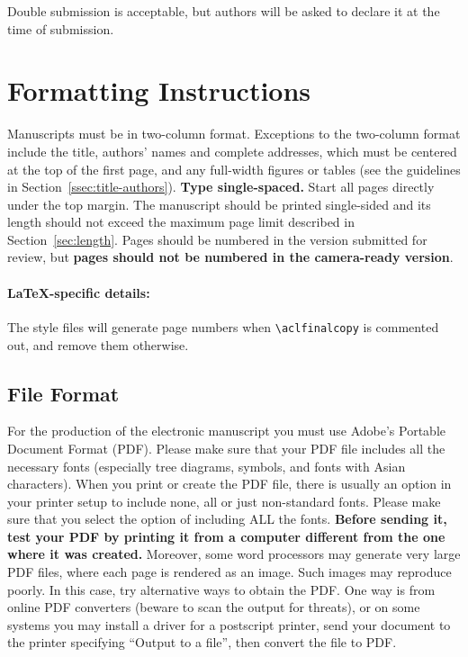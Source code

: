 \documentclass[11pt,a4paper]{article}
\begin{document}
Double submission is acceptable, but authors will be asked to declare it at the time of submission. 

\section{Formatting Instructions}

Manuscripts must be in two-column format.
Exceptions to the two-column format include the title, authors' names and complete addresses, which must be centered at the top of the first page, and any full-width figures or tables (see the guidelines in Section~\ref{ssec:title-authors}).
\textbf{Type single-spaced.}
Start all pages directly under the top margin.
The manuscript should be printed single-sided and its length should not exceed the maximum page limit described in Section~\ref{sec:length}.
Pages should be numbered in the version submitted for review, but \textbf{pages should not be numbered in the camera-ready version}.

\paragraph{\LaTeX-specific details:}
The style files will generate page numbers when {\small\verb|\aclfinalcopy|} is commented out, and remove them otherwise.


\subsection{File Format}
\label{sect:pdf}

For the production of the electronic manuscript you must use Adobe's Portable Document Format (PDF).
Please make sure that your PDF file includes all the necessary fonts (especially tree diagrams, symbols, and fonts with Asian characters).
When you print or create the PDF file, there is usually an option in your printer setup to include none, all or just non-standard fonts.
Please make sure that you select the option of including ALL the fonts.
\textbf{Before sending it, test your PDF by printing it from a computer different from the one where it was created.}
Moreover, some word processors may generate very large PDF files, where each page is rendered as an image.
Such images may reproduce poorly.
In this case, try alternative ways to obtain the PDF.
One way is from online PDF converters (beware to scan the output for threats), or on some systems you may install a driver for a postscript printer, send your document to the printer specifying ``Output to a file'', then convert the file to PDF.
\end{document}
